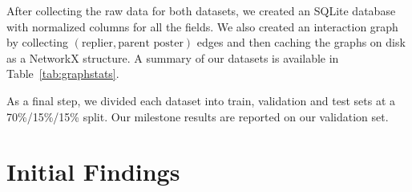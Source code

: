 \documentclass[10pt]{article}
\begin{document}

After collecting the raw data for both datasets, we created an SQLite database
with normalized columns for all the fields. We also created an interaction graph
by collecting $(\text{replier}, \text{parent poster})$ edges and then caching the graphs
on disk as a NetworkX structure. A summary of our datasets is available in 
Table~\ref{tab:graphstats}.

As a final step, we divided each dataset into train, validation and test sets at
a 70\%/15\%/15\% split. Our milestone results are reported on our validation
set.

\section{Initial Findings}
\end{document}
